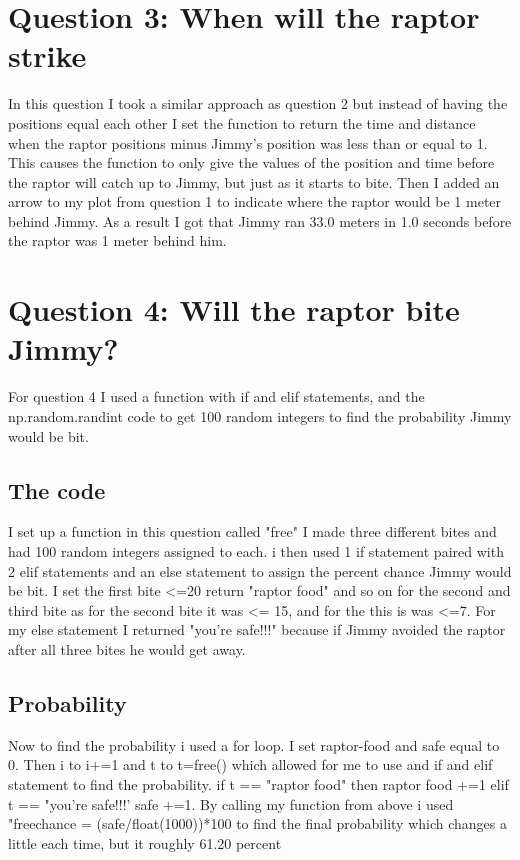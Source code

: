 \documentclass[twocolumn]{revtex4}
\begin{document}
\section{Question 3: When will the raptor strike}

In this question I took a similar approach as question 2 but instead of having the positions equal each other I set the function to return the time and distance when the raptor positions minus Jimmy's position was less than or equal to 1. This causes the function to only give the values of the position and time before the raptor will catch up to Jimmy, but just as it starts to bite. Then I added an arrow to my plot from question 1 to indicate where the raptor would be 1 meter behind Jimmy. As a result I got that Jimmy ran 33.0 meters in 1.0 seconds before the raptor was 1 meter behind him.

\section{Question 4: Will the raptor bite Jimmy?}

For question 4 I used a function with if and elif statements, and the np.random.randint code to get 100 random integers to find the probability Jimmy would be bit. 

\subsection{The code}

I set up a function in this question called "free" I made three different bites and had 100 random integers assigned to each. i then used 1 if statement paired with 2 elif statements and an else statement to assign the percent chance Jimmy would be bit. I set the first bite <=20 return "raptor food" and so on for the second and third bite as for the second bite it was <= 15, and for the this is was <=7. For my else statement I returned "you're safe!!!" because if Jimmy avoided the raptor after all three bites he would get away. 

\subsection{Probability}

Now to find the probability i used a for loop. I set raptor-food and safe equal to 0. Then i to i+=1 and t to t=free() which allowed for me to use and if and elif statement to find the probability. if t == "raptor food" then raptor food +=1 elif t == "you're safe!!!' safe +=1. By calling my function from above i used "freechance = (safe/float(1000))*100 to find the final probability which changes a little each time, but it roughly 61.20 percent 
\end{document}
